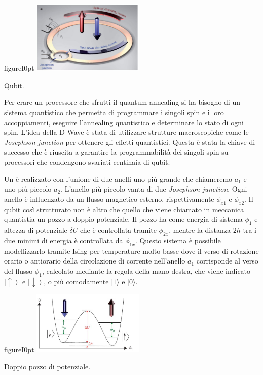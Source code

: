 \begin{wrapfloat}{figure}{I}{0pt}
\includegraphics[width=0.4\textwidth]{Immagini/qubit.jpg}
\caption{Qubit.}
\label{figura:qubit}
\end{wrapfloat}
\cite{QAS,QVC}Per crare un processore che sfrutti il quantum annealing si ha bisogno di un sistema quantistico che permetta di programmare i singoli spin e i loro accoppiamenti, eseguire l'annealing quantistico e determinare lo stato di ogni spin. L'idea della D-Wave è stata di utilizzare strutture macroscopiche come le \textit{Josephson junction} per ottenere gli effetti quantistici. Questa è stata la chiave di successo che è riuscita a garantire la programmabilità dei singoli spin su processori che condengono svariati centinaia di qubit.

Un  è realizzato con l'unione di due anelli uno più grande che chiameremo $a_1$ e uno più piccolo $a_2$. L'anello più piccolo vanta di due \textit{Josephson junction}. Ogni anello è influenzato da un flusso magnetico esterno, rispettivamente $\phi_{x1}$ e $\phi_{x2}$. Il qubit così strutturato non è altro che quello che viene chiamato in meccanica quantistia un pozzo a doppio potenziale. Il pozzo ha come energia di sistema $\phi_1$ e altezza di potenziale $\delta U$ che è controllata tramite $\phi_{2x}$, mentre la distanza $2h$ tra i due minimi di energia è controllata da $\phi_{1x}$.
Questo sistema è possibile modellizzarlo tramite Ising per temperature molto basse dove il verso di rotazione orario o antiorario della circolazione di corrente nell'anello $a_1$ corrisponde al verso del flusso $\phi_1$, calcolato mediante la regola della mano destra, che viene indicato $\left|\uparrow \right\rangle$ e $\left|\downarrow \right\rangle$, o più comodamente $|1 \rangle$ e $|0 \rangle$.
\begin{wrapfloat}{figure}{I}{0pt}
\includegraphics[width=0.4\textwidth]{Immagini/pozzo.jpg}
\caption{Doppio pozzo di potenziale.}
\label{figura:pozzo}
\end{wrapfloat}

